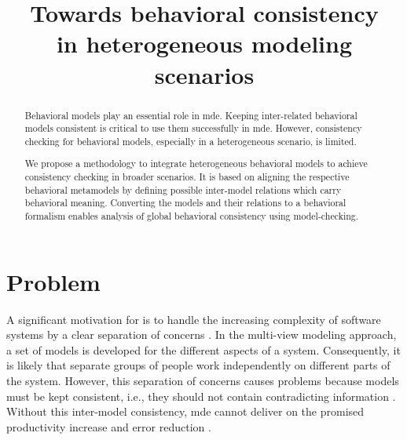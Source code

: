 \documentclass[conference]{IEEEtran}
\begin{document}
\title{Towards behavioral consistency \\ in heterogeneous modeling scenarios}

\author{
}


\maketitle

\begin{abstract}
Behavioral models play an essential role in \gls{mde}.
Keeping inter-related behavioral models consistent is critical to use them successfully in \gls{mde}. 
However, consistency checking for behavioral models, especially in a heterogeneous scenario, is limited.

We propose a methodology to integrate heterogeneous behavioral models to achieve consistency checking in broader scenarios.
It is based on aligning the respective behavioral metamodels by defining possible inter-model relations which carry behavioral meaning.
Converting the models and their relations to a behavioral formalism enables analysis of global behavioral consistency using model-checking. 
\end{abstract}


\IEEEpeerreviewmaketitle



\section{Problem}
A significant motivation for  is to handle the increasing complexity of software systems by a clear separation of concerns \cite{franceModeldrivenDevelopmentComplex2007}.
In the multi-view modeling approach, a set of models is developed for the different aspects of a system.
Consequently, it is likely that separate groups of people work independently on different parts of the system.
However, this separation of concerns causes problems because models must be kept consistent, i.e., they should not contain contradicting information \cite{cicchettiMultiviewApproachesSoftware2019}.
Without this inter-model consistency, \gls{mde} cannot deliver on the promised productivity increase and error reduction \cite{brambillaModeldrivenSoftwareEngineering2017}.
\end{document}
